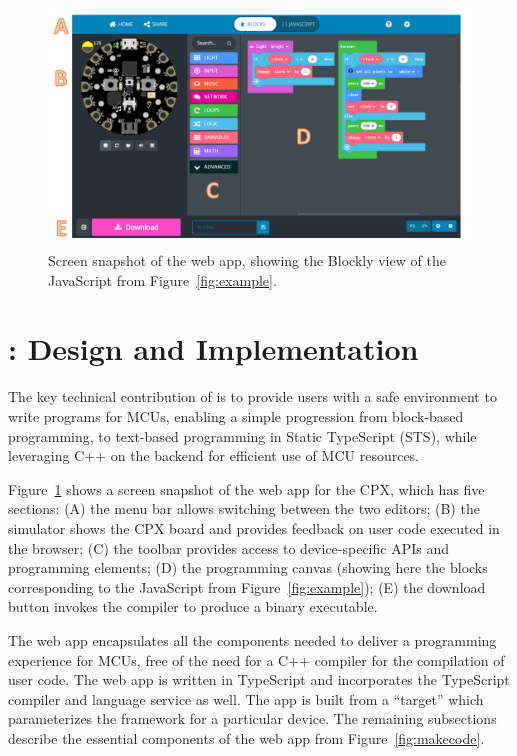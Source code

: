 
\begin{figure}[t]
    \includegraphics[width=6in]{CPXfig.pdf}
\caption{\label{fig:screenSnap}Screen snapshot of the \MC web app, showing the Blockly
view of the JavaScript from Figure~\ref{fig:example}.}
\end{figure}


\section{\MCN: Design and Implementation}
\label{sec:makecode}
The key technical contribution of \MC is to provide users with a safe environment to write programs for MCUs, enabling a simple progression from block-based
programming, to text-based programming in Static TypeScript (STS), 
while leveraging C++ on the backend for efficient use of MCU resources.

Figure~\ref{fig:screenSnap} shows a screen snapshot of the \MC web app for the CPX,
which has five sections:
(A) the menu bar allows switching between the two editors;
(B) the simulator shows the CPX board and provides feedback on user code executed in the browser;
(C) the toolbar provides access to device-specific APIs and programming elements;
(D) the programming canvas (showing here the blocks corresponding to the JavaScript from Figure~\ref{fig:example});
(E) the download button invokes the compiler to produce a binary executable.

The web app encapsulates all the components needed to deliver a programming experience
for MCUs, free of the need for a C++ compiler for the compilation of user code.
The web app is written in TypeScript and incorporates the TypeScript compiler and
language service as well.
The app is built from a \MC ``target''
which parameterizes the \MC framework for a particular device.
The remaining subsections describe the essential components of the web app 
from Figure~\ref{fig:makecode}.

